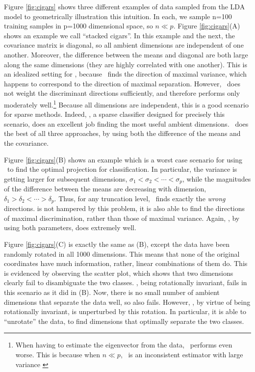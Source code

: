 \documentclass[10pt]{article}
\begin{document}
Figure \ref{fig:cigars} shows three different examples of data sampled from the LDA model to geometrically illustration this intuition.
In each, we sample n=100 training samples in p=1000 dimensional space, so $n \ll p$.  
Figure \ref{fig:cigars}(A) shows an example we call  ``stacked cigars''. 
In this example and the next, the covariance matrix is diagonal, so all ambient dimensions are independent of one another.  
Moreover,  the difference between the means and diagonal are both large along the same dimensions (they are highly correlated with one another). 
This is an idealized setting for \Pca, because \Pca~finds the direction of maximal variance, which happens to correspond to the direction of maximal separation.  
However, \Pca~does not weight the discriminant directions sufficiently, and therefore performs only moderately well.\footnote{When having to estimate the eigenvector from the data, \Pca~performs even worse.  This is because when $n \ll p$, \Pca~is an inconsistent estimator with large variance \cite{Baik2006,Paul2007}}
Because all dimensions are independent, this is a good scenario for sparse methods.  
Indeed,  , a sparse classifier designed for precisely this scenario,  does an excellent job finding the most useful ambient dimensions.  
\Lol~does the best of all three approaches, by using both the difference of the means and the covariance.


Figure \ref{fig:cigars}(B) shows an example which is a worst case scenario for using \Pca~to find the optimal projection for classification.  
In particular, the variance is getting larger for subsequent dimensions, $\sigma_1 < \sigma_2 < \cdots < \sigma_p$, while the magnitudes of the difference between the means are decreasing with dimension, $\delta_1 > \delta_2 < \cdots > \delta_p$. 
Thus, for any truncation level,  \Pca~finds exactly the \emph{wrong} directions.  
 is not hampered by this problem, it is also able to find the directions of maximal discrimination, rather than those of maximal variance.
Again, \Lol, by using both parameters, does extremely well.


Figure \ref{fig:cigars}(C) is exactly the same as (B), except the data have been randomly rotated in all 1000 dimensions.  This means that none of the original coordinates have much information, rather, linear combinations of them do.  
This is evidenced by observing the scatter plot, which shows that two dimensions clearly fail to disambiguate the two classes.
\Pca, being rotationally invariant, fails in this scenario as it did in (B).
Now, there is no small number of ambient dimensions that separate the data well, so  also fails.
However, \Lol, by virtue of being rotationally invariant, is unperturbed by this rotation.  In particular, it is able to ``unrotate'' the data, to find dimensions that optimally separate the two classes.  
\end{document}
